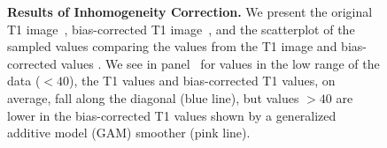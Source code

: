 \documentclass[a4paper]{report}\usepackage[]{graphicx}\usepackage[]{color}
\newcommand{\CRANpkg}[1]{\href{http://CRAN.R-project.org/package=#1}{\pkg{#1}}}%
\let\pkg=\strong
\begin{document}
\begin{article}
\begin{figure}
\hfill
\hfill
\caption{{\bf Results of Inhomogeneity Correction.}  We present the original T1 image~\protect{}, bias-corrected T1 image~\protect{}, and the scatterplot of the sampled values comparing the values from the T1 image and bias-corrected values \protect{}.  We see in panel~\protect{} for values in the low range of the data ($< 40$), the T1 values and bias-corrected T1 values, on average, fall along the diagonal (blue line), but values $> 40$ are lower in the bias-corrected T1 values shown by a generalized additive model (GAM) smoother (pink line).  }
\label{fig:bias_correct}
\end{figure}





\end{article}
\end{document}
